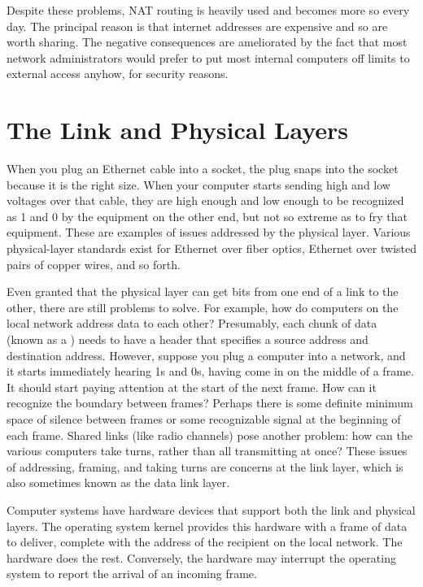 Despite these problems, NAT routing is heavily used and becomes more
so every day.  The principal reason is that internet addresses are
expensive and so are worth sharing.  The negative consequences are
ameliorated by the fact that most network administrators would prefer to
put most internal computers off limits to external access anyhow, for
security reasons.

\section{The Link and Physical
  Layers}\label{link-physical-layers-section}

When you plug an Ethernet cable into a socket, the plug snaps into the
socket because it is the right size.  When your computer starts
sending high and low voltages over that cable, they are high enough
and low enough to be recognized as 1 and 0 by the equipment on the
other end, but not so extreme as to fry that equipment.  These are
examples of issues addressed by the physical layer.  Various physical-layer
standards exist for Ethernet over fiber optics, Ethernet over twisted
pairs of copper wires, and so forth.

Even granted that the physical layer can get bits from one end of a link to the
other, there are still problems to solve.  For example, how do
computers on the local network address data to each other?  Presumably,
each chunk of data (known as a ) needs to have a header
that specifies a source address and destination address.  However, suppose
you plug a computer into a network, and it starts immediately hearing
1s and 0s, having come in on the middle of a frame.  It should start
paying attention at the start of the next frame.  How can it recognize
the boundary between frames?  Perhaps there is some definite minimum
space of silence between frames or some recognizable signal at the
beginning of each frame.  Shared
links (like radio channels) pose another problem: how can the various
computers take turns, rather than all transmitting at once?  These
issues of addressing, framing, and taking turns are concerns at the
link layer, which is also sometimes known as the data link layer.

Computer systems have hardware devices that support both the link and
physical layers.  The operating system kernel provides this hardware
with a frame of data to deliver, complete with the address of the
recipient on the local network.  The hardware does the rest.
Conversely, the hardware may interrupt the operating system to report
the arrival of an incoming frame.

